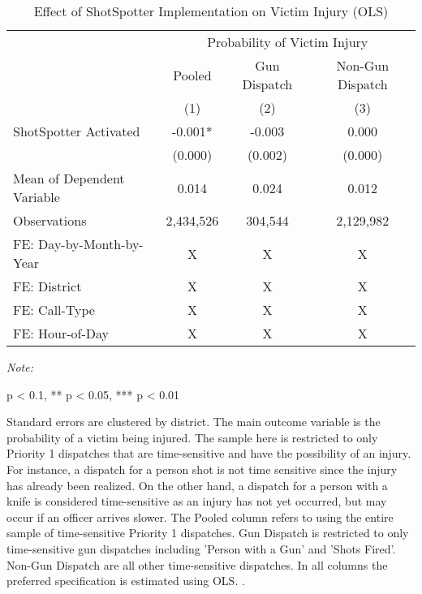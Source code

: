\begin{table}[H]

\caption{\label{victim_table}Effect of ShotSpotter Implementation on Victim Injury (OLS)}
\centering
\begin{threeparttable}
\fontsize{11}{13}\selectfont
\begin{tabular}[t]{>{\raggedright\arraybackslash}p{8cm}ccc}
\toprule
\multicolumn{1}{c}{ } & \multicolumn{3}{c}{Probability of Victim Injury} \\
\cmidrule(l{3pt}r{3pt}){2-4}
\multicolumn{1}{c}{ } & \multicolumn{1}{c}{Pooled} & \multicolumn{1}{c}{Gun Dispatch} & \multicolumn{1}{c}{Non-Gun Dispatch} \\
\cmidrule(l{3pt}r{3pt}){2-2} \cmidrule(l{3pt}r{3pt}){3-3} \cmidrule(l{3pt}r{3pt}){4-4}
  & (1) & (2) & (3)\\
\midrule
ShotSpotter Activated & -0.001* & -0.003 & 0.000\\
 & (0.000) & (0.002) & (0.000)\\
Mean of Dependent Variable & 0.014 & 0.024 & 0.012\\
Observations & 2,434,526 & 304,544 & 2,129,982\\
FE: Day-by-Month-by-Year & X & X & X\\
\addlinespace
FE: District & X & X & X\\
FE: Call-Type & X & X & X\\
FE: Hour-of-Day & X & X & X\\
\bottomrule
\end{tabular}
\begin{tablenotes}
\item \textit{Note: } 
\item * p < 0.1, ** p < 0.05, *** p < 0.01
\item Standard errors are clustered by district.                       The main outcome variable is the probability of a victim being                      injured.                      The sample here is restricted to only Priority 1 dispatches that                      are time-sensitive and have the possibility of an injury. For instance,                      a dispatch for a person shot is not time sensitive since                      the injury has already been realized. On the other                      hand, a dispatch for a person with a knife is considered time-sensitive as                      an injury has not yet occurred, but may occur if an officer arrives slower.                      The Pooled column refers to using the entire sample of time-sensitive Priority 1                      dispatches.                      Gun Dispatch is restricted to only time-sensitive gun dispatches including                      'Person with a Gun' and 'Shots Fired'. Non-Gun Dispatch are all other                      time-sensitive dispatches. In all columns the preferred specification is estimated using                      OLS.                   .                   
\end{tablenotes}
\end{threeparttable}
\end{table}
